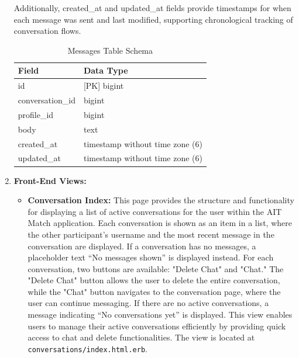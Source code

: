 \begin{enumerate}
    \bigskip Additionally, created\_at and updated\_at fields provide timestamps for when each message was sent and last modified, supporting chronological tracking of conversation flows.
    
    \begin{table}[h!]
    \captionsetup{justification=centering, singlelinecheck=false, labelsep=space}
    \centering
    \begin{tabular}{ll}
    \hline
    \textbf{Field}               & \textbf{Data Type}                 \\ \hline
    id                           & [PK] bigint                        \\ 
    conversation\_id             & bigint                             \\ 
    profile\_id                  & bigint                             \\ 
    body                         & text                               \\ 
    created\_at                  & timestamp without time zone (6)    \\ 
    updated\_at                  & timestamp without time zone (6)    \\ \hline
    \end{tabular}
    \caption{Messages Table Schema}
    \label{tab:Messages Table Schema}
    \end{table}

    \newpage
    \item \textbf{Front-End Views:}
    \begin{itemize}
        \item \textbf{Conversation Index:}  
        This page provides the structure and functionality for displaying a list of active conversations for the user within the AIT Match application. Each conversation is shown as an item in a list, where the other participant’s username and the most recent message in the conversation are displayed. If a conversation has no messages, a placeholder text “No messages shown” is displayed instead. For each conversation, two buttons are available: "Delete Chat" and "Chat." The "Delete Chat" button allows the user to delete the entire conversation, while the "Chat" button navigates to the conversation page, where the user can continue messaging. If there are no active conversations, a message indicating “No conversations yet” is displayed. This view enables users to manage their active conversations efficiently by providing quick access to chat and delete functionalities. The view is located at \texttt{conversations/index.html.erb}.
    

\end{itemize}
\end{enumerate}
